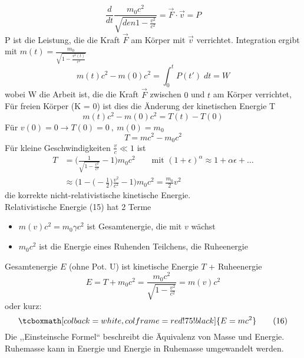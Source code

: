 \documentclass[titlepage,12pt,a4paper,ngerman]{report}
\newcommand{\tx}[1]{\textrm{#1}}
\newcommand{\rmbox}[1]{\tcboxmath[colback=white,colframe=red!75!black]{#1}} %
\begin{document}
\begin{equation*}
\frac{d}{dt} \frac{m_0c^2}{\sqrt{den1 - \frac{v^2}{c^2}}} = \vec{F} \cdot \vec{v} = P \tag{14}
\end{equation*}
P ist die Leistung, die die Kraft $ \vec{F} $ am Körper mit $ \vec{v} $ verrichtet. Integration ergibt mit $ m(t) = \frac{m_0}{\sqrt{1 - \frac{v^2(t)}{c^2}}} $
\begin{equation*}
m(t) c^2 - m(0) c^2 = \int_{0}^{t} P(t') \; dt = W
\end{equation*}
wobei W die Arbeit ist, die die Kraft $ \vec{F} $ zwischen $ 0 $ und $ t $ am Körper verrichtet,\\
Für freien Körper (K = 0) ist dies die Änderung der kinetischen Energie T
\begin{equation*}
m(t) c^2 - m(0) c^2 = T(t) - T(0)
\end{equation*}
Für $ v(0) = 0 \rightarrow T(0) = 0\ , \ m(0) = m_0 $
\begin{equation*}
T = m c^2 - m_0 c^2 \tag{15}
\end{equation*}
Für kleine Geschwindigkeiten $ \frac{v}{c} \ll 1 $ ist
\begin{align*}
T &= \Bigg( \frac{1}{\sqrt{1 - \frac{v^2}{c^2}}} - 1 \Bigg) m_0 c^2 \qquad \tx{mit } (1+ \epsilon)^\alpha \approx 1 + \alpha \epsilon + \dots\\
&\approx \bigg( 1 - \Big( - \frac{1}{2} \Big) \frac{v^2}{c^2} - 1 \bigg) m_0 c^2 = \frac{m_0}{2} v^2
\end{align*}
die korrekte nicht-relativistische kinetische Energie.\\
Relativistische Energie (15) hat 2 Terme
\begin{itemize}
	\item $ m(v) c^2 = m_0 \gamma c^2 $ ist Gesamtenergie, die mit $ v $ wächst
	\item $ m_0c^2 $ ist die Energie eines Ruhenden Teilchens, die Ruheenergie
\end{itemize}
Gesamtenergie $ E $ (ohne Pot. U) ist kinetische Energie $ T $ + Ruheenergie
\begin{equation*}
E = T + m_0 c^2 = \frac{m_0 c^2}{\sqrt{1 - \frac{v^2}{c^2}}} = m(v) c^2
\end{equation*}
oder kurz:
\begin{equation*}
\rmbox{E = mc^2_{\phantom{2}}} \tag{16}
\end{equation*}
Die ,,Einsteinsche Formel`` beschreibt die Äquivalenz von Masse und Energie. Ruhemasse kann in Energie und Energie in Ruhemasse umgewandelt werden.\\[5pt]
\end{document}
